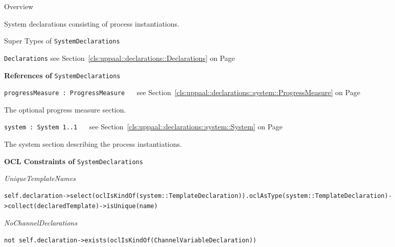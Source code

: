 	\begin{longdescription}
		\item[Overview] 		
				

	

		System declarations consisting of process instantiations.		
		\item[Super Types of \texttt{SystemDeclarations}] ~
			\begin{longdescription}
				\item[\texttt{Declarations}] see Section~\ref{cls:uppaal::declarations::Declarations} on Page~\pageref{cls:uppaal::declarations::Declarations}						\end{longdescription}
		
	
			\item[\textbf{References of} \texttt{SystemDeclarations}] ~
			\begin{longdescription}
	\item[\texttt{progressMeasure : ProgressMeasure 	}] ~
	see Section~\ref{cls:uppaal::declarations::system::ProgressMeasure} on Page~\pageref{cls:uppaal::declarations::system::ProgressMeasure}
	
	\nopagebreak
		
				

	

		The optional progress measure section.		
	\item[\texttt{system : System 	\symbol{"5B}1..1\symbol{"5D}
}] ~
	see Section~\ref{cls:uppaal::declarations::system::System} on Page~\pageref{cls:uppaal::declarations::system::System}
	
	\nopagebreak
		
				

	

		The system section describing the process instantiations.		
			\end{longdescription}
			\item[\textbf{OCL Constraints of} \texttt{SystemDeclarations}] ~
			\begin{longdescription}
	\item[\small\textit{UniqueTemplateNames}] ~ 
	\nopagebreak
	
		\begin{lstlisting}[breaklines=true]
self.declaration->select(oclIsKindOf(system::TemplateDeclaration)).oclAsType(system::TemplateDeclaration)->collect(declaredTemplate)->isUnique(name)		\end{lstlisting}
	\item[\small\textit{NoChannelDeclarations}] ~ 
	\nopagebreak
	
		\begin{lstlisting}[breaklines=true]
not self.declaration->exists(oclIsKindOf(ChannelVariableDeclaration))		\end{lstlisting}
			\end{longdescription}
	
	\end{longdescription}
	

